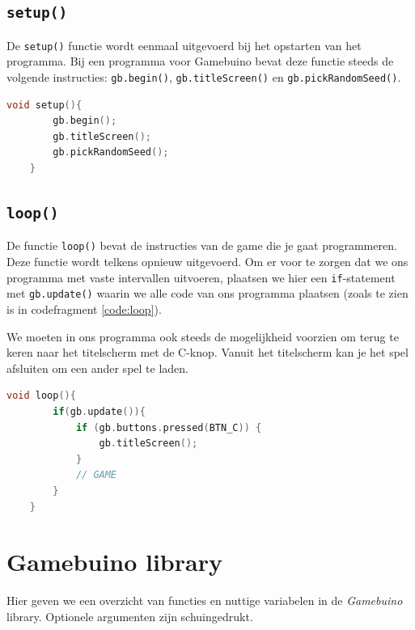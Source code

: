 \documentclass[a4paper,titlepage,12pt]{article}
\begin{document}
	
	\subsection{\texttt{setup()}}
	De \texttt{setup()} functie wordt eenmaal uitgevoerd bij het opstarten van het programma. Bij een programma voor Gamebuino bevat deze functie steeds de volgende instructies: \texttt{gb.begin()}, \texttt{gb.titleScreen()} en \texttt{gb.pickRandomSeed()}.
	\begin{lstlisting}[language=C++, caption={\texttt{setup()}}]
	void setup(){
		gb.begin();
		gb.titleScreen();
		gb.pickRandomSeed();
	}
	\end{lstlisting}
	
	
	\subsection{\texttt{loop()}}
	De functie \texttt{loop()} bevat de instructies van de game die je gaat programmeren. Deze functie wordt telkens opnieuw uitgevoerd. Om er voor te zorgen dat we ons programma met vaste intervallen uitvoeren, plaatsen we hier een \texttt{if}-statement met \texttt{gb.update()} waarin we alle code van ons programma plaatsen (zoals te zien is in codefragment \ref{code:loop}).
	
	We moeten in ons programma ook steeds de mogelijkheid voorzien om terug te keren naar het titelscherm met de C-knop. Vanuit het titelscherm kan je het spel afsluiten om een ander spel te laden.
	
	\begin{lstlisting}[float=!ht, language=C++, caption={\texttt{loop()}}, label={code:loop}]
	void loop(){
		if(gb.update()){
			if (gb.buttons.pressed(BTN_C)) {
				gb.titleScreen();
			}
			// GAME
		}
	}
	\end{lstlisting}
	
	
	\newpage
	\section{Gamebuino library}
	Hier geven we een overzicht van functies en nuttige variabelen in de \emph{Gamebuino} library.\cite{Gamebuino:Wiki:Reference}
	Optionele argumenten zijn schuingedrukt.
	
\end{document}

